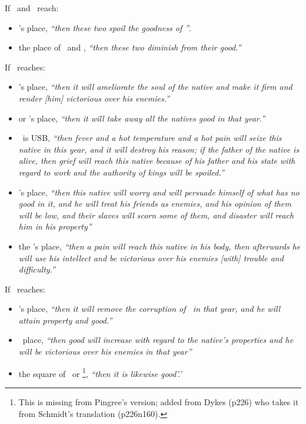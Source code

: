 If   \Saturn\, and \Mars\, reach:
\begin{itemize}[topsep=0em,itemsep=0em]
\item \Jupiter's place, \textsl{``then these two spoil the goodness of \Jupiter''}.

\item the place of \Venus\, and \Mercury, \textsl{``then these two diminish from their good.''}
\end{itemize}

If  \Mars\, reaches:

\begin{itemize}[topsep=0em,itemsep=0em]
\item \Saturn's place, \textsl{``then it will ameliorate the soul of the native and make it firm and render [him] victorious over his enemies.''}

\item  \Venus or \Jupiter's place, \textsl{``then it will take away all the natives good in that year.''}

\item \Mars\, is USB, \textsl{``then fever and a hot temperature and a hot pain will seize this native in this year, and it will destroy his reason; if the father of the native is alive, then grief will reach this native because of his father and his state with regard to work and the authority of kings will be spoiled.''}

\item {}\Mercury's place, \textsl{``then this native will worry and will persuade himself of what has no good in it, and he will treat his friends as enemies, and his opinion of them will be low, and their slaves will scorn some of them, and disaster will reach him in his property''}

\item the \Moon's place, \textsl{``then a pain will reach this native in his body, then afterwards he will use his intellect and be victorious over his enemies [with] trouble and difficulty.''}
\end{itemize}

If  \Jupiter\, reaches:
\begin{itemize}[topsep=0em,itemsep=0em]
\item \Saturn's place, \textsl{``then it will remove the corruption of \Saturn\, in that year, and he will attain property and good.''}

\item \Mars\, place, \textsl{``then good will increase with regard to the native's properties and he will be victorious over his enemies in that year''}

\item the square of \Mars\, or \Saturn\footnote{This is missing from Pingree's version; added from Dykes (p226) who takes it from Schmidt's translation (p226n160).}, \textsl{``then it is likewise good'.'}
\end{itemize}

